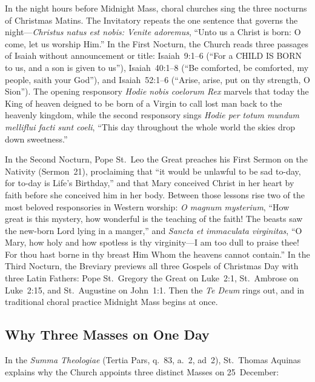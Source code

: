 In the night hours before Midnight Mass, choral churches sing the three nocturns
of Christmas Matins. The Invitatory repeats the one sentence that governs the
night---\textit{Christus natus est nobis: Venite adoremus}, ``Unto us a Christ
is born: O come, let us worship Him.'' In the First Nocturn, the Church reads
three passages of Isaiah without announcement or title: Isaiah~9:1--6 (``For a
CHILD IS BORN to us, and a son is given to us''), Isaiah~40:1--8 (``Be
comforted, be comforted, my people, saith your God''), and Isaiah~52:1--6
(``Arise, arise, put on thy strength, O Sion''). The opening responsory
\textit{Hodie nobis coelorum Rex} marvels that today the King of heaven deigned
to be born of a Virgin to call lost man back to the heavenly kingdom, while the
second responsory sings \textit{Hodie per totum mundum melliflui facti sunt
coeli}, ``This day throughout the whole world the skies drop down sweetness.''

In the Second Nocturn, Pope St.~Leo the Great preaches his First Sermon on the
Nativity (Sermon~21), proclaiming that ``it would be unlawful to be sad to-day,
for to-day is Life's Birthday,'' and that Mary conceived Christ in her heart by
faith before she conceived him in her body. Between those lessons rise two of
the most beloved responsories in Western worship: \textit{O magnum mysterium},
``How great is this mystery, how wonderful is the teaching of the faith! The
beasts saw the new-born Lord lying in a manger,'' and \textit{Sancta et
immaculata virginitas}, ``O Mary, how holy and how spotless is thy
virginity---I am too dull to praise thee! For thou hast borne in thy breast Him
Whom the heavens cannot contain.'' In the Third Nocturn, the Breviary previews
all three Gospels of Christmas Day with three Latin Fathers: Pope St.~Gregory
the Great on Luke~2:1, St.~Ambrose on Luke~2:15, and St.~Augustine on John~1:1.
Then the \textit{Te Deum} rings out, and in traditional choral practice Midnight
Mass begins at once.

\subsection{Why Three Masses on One Day}

In the \textit{Summa Theologiae} (Tertia Pars, q.~83, a.~2, ad~2), St.~Thomas
Aquinas explains why the Church appoints three distinct Masses on 25~December:

